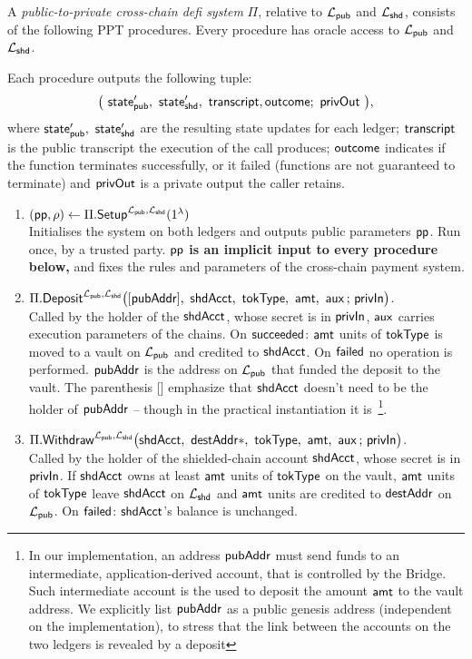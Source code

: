 \begin{definition}
\label{def:system}
A \emph{public-to-private cross-chain defi system} $\Pi$, relative to $\mathcal{L}_{\mathsf{pub}}$ and $\mathcal{L}_{\mathsf{shd}}$,
consists of the following PPT procedures.
Every procedure has oracle access to $\mathcal{L}_{\mathsf{pub}}$ and $\mathcal{L}_{\mathsf{shd}}$.

Each procedure outputs the following  tuple:
\[
\bigl(\ \stpub',\ \stshd',\ \trans, \outc; \ \prvOut\ \bigr),
\]
where  $\stpub',\ \stshd'$ are the resulting state  updates for  each ledger; $\mathsf{transcript}$ is the public transcript the execution of the call produces;
 $\mathsf{outcome}$ indicates if the function terminates  successfully, or it failed (functions are not guaranteed to terminate)  and $\mathsf{privOut}$ is a  private output the caller retains.

\begin{enumerate}[leftmargin=1.8em,itemsep=6pt]
\item $(\mathsf{pp}, \rho) \gets \Pi.\mathsf{Setup}^{\mathcal{L}_{\mathsf{pub}}, \mathcal{L}_{\mathsf{shd}}}(1^{\lambda})$\\
  Initialises the system on both ledgers and outputs public parameters $\mathsf{pp}$. Run once, by a
  trusted party.  \textbf{$\mathsf{pp}$ is an implicit input to every procedure below,} and fixes the rules and  parameters of the cross-chain payment system.

\item $\Pi.\Deposit^{\Lpub, \Lshd}\bigl([\pubAddr]\bc \shdAcct\bc \tokType\bc \amt\bc
      \auxx \,;\, \privIn\bigr)$.\\
  Called by the holder of the  $\mathsf{shdAcct}$, whose secret is in $\mathsf{privIn}$, $\mathsf{aux}$ carries execution parameters of the chains.
  On $\mathsf{succeeded}$: $\mathsf{amt}$ units of $\mathsf{tokType}$  is moved to a vault on $\mathcal{L}_{\mathsf{pub}}$ and credited to
  $\mathsf{shdAcct}$.  On $\mathsf{failed}$ no operation is performed.
  $\mathsf{pubAddr}$ is the address on $\mathcal{L}_{\mathsf{pub}}$ that funded the deposit to the vault. The parenthesis [] emphasize that $\mathsf{shdAcct}$ doesn't need to be the holder of  $\mathsf{pubAddr}$ -- though in the practical instantiation it is~\footnote{In our implementation, an address $\mathsf{pubAddr}$ must send funds to an intermediate, application-derived account, that is controlled by the Bridge. Such intermediate account is the used to deposit the amount $\mathsf{amt}$ to the vault address. We explicitly list $\mathsf{pubAddr}$ as a public genesis address (independent on the implementation), to stress that the link between the accounts on the two ledgers is revealed by a deposit}.
\item $\Pi.\Withdraw^{\Lpub, \Lshd}\bigl(\shdAcct\bc \destAddr*\bc \tokType\bc \amt\bc
      \auxx \,;\, \privIn\bigr)$.\\
  Called by the holder of the shielded-chain account $\mathsf{shdAcct}$, whose secret is in $\mathsf{privIn}$.
  If $\mathsf{shdAcct}$ owns at least $\mathsf{amt}$ units of $\mathsf{tokType}$ on the vault,  $\mathsf{amt}$ units of $\mathsf{tokType}$ leave $\mathsf{shdAcct}$ on $\mathcal{L}_{\mathsf{shd}}$ and $\mathsf{amt}$ units are
  credited to $\mathsf{destAddr}$ on $\mathcal{L}_{\mathsf{pub}}$. On $\mathsf{failed}$: $\mathsf{shdAcct}$'s balance is unchanged.



\end{enumerate}
\end{definition}
